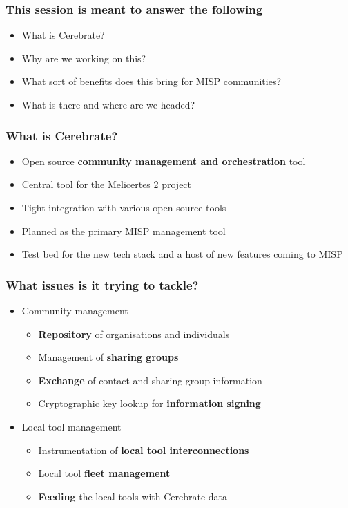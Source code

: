 
\begin{frame}[t,plain]
\titlepage
\end{frame}

\begin{frame}
	\frametitle{This session is meant to answer the following}
	\begin{itemize}
		\item What is Cerebrate?
                \item Why are we working on this?
                \item What sort of benefits does this bring for MISP communities?
                \item What is there and where are we headed?
	\end{itemize}
\end{frame}

\begin{frame}
	\frametitle{What is Cerebrate?}
	\begin{itemize}
                \item Open source {\bf community management and orchestration} tool
                \item Central tool for the Melicertes 2 project
                \item Tight integration with various open-source tools
                \item Planned as the primary MISP management tool
                \item Test bed for the new tech stack and a host of new features coming to MISP
	\end{itemize}
\end{frame}

\begin{frame}
	\frametitle{What issues is it trying to tackle?}
	\begin{itemize}
                \item Community management
		\begin{itemize}
                    \item {\bf Repository} of organisations and individuals
                    \item Management of {\bf sharing groups}
                    \item {\bf Exchange} of contact and sharing group information
                    \item Cryptographic key lookup for {\bf information signing}
		\end{itemize}
                \item Local tool management
		\begin{itemize}
                    \item Instrumentation of {\bf local tool interconnections}
                    \item Local tool {\bf fleet management}
                    \item {\bf Feeding} the local tools with Cerebrate data
                \end{itemize}
	\end{itemize}
\end{frame}

